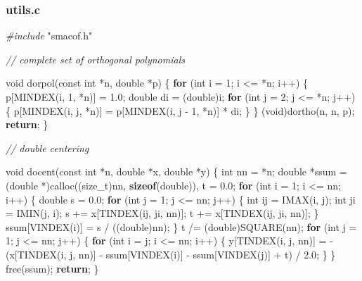 \documentclass[12pt,]{article}
\newenvironment{Shaded}{\begin{snugshade}}{\end{snugshade}}
\newcommand{\KeywordTok}[1]{\textcolor[rgb]{0.13,0.29,0.53}{\textbf{#1}}}
\newcommand{\DataTypeTok}[1]{\textcolor[rgb]{0.13,0.29,0.53}{#1}}
\newcommand{\DecValTok}[1]{\textcolor[rgb]{0.00,0.00,0.81}{#1}}
\newcommand{\FloatTok}[1]{\textcolor[rgb]{0.00,0.00,0.81}{#1}}
\newcommand{\ImportTok}[1]{#1}
\newcommand{\CommentTok}[1]{\textcolor[rgb]{0.56,0.35,0.01}{\textit{#1}}}
\newcommand{\ControlFlowTok}[1]{\textcolor[rgb]{0.13,0.29,0.53}{\textbf{#1}}}
\newcommand{\PreprocessorTok}[1]{\textcolor[rgb]{0.56,0.35,0.01}{\textit{#1}}}
\newcommand{\NormalTok}[1]{#1}
\begin{document}
\subsubsection{utils.c}\label{utils.c}

\begin{Shaded}
\begin{Highlighting}[]
\PreprocessorTok{#include }\ImportTok{"smacof.h"}

\CommentTok{// complete set of orthogonal polynomials}

\DataTypeTok{void}\NormalTok{ dorpol(}\DataTypeTok{const} \DataTypeTok{int}\NormalTok{ *n, }\DataTypeTok{double}\NormalTok{ *p) \{}
    \ControlFlowTok{for}\NormalTok{ (}\DataTypeTok{int}\NormalTok{ i = }\DecValTok{1}\NormalTok{; i <= *n; i++) \{}
\NormalTok{        p[MINDEX(i, }\DecValTok{1}\NormalTok{, *n)] = }\FloatTok{1.0}\NormalTok{;}
        \DataTypeTok{double}\NormalTok{ di = (}\DataTypeTok{double}\NormalTok{)i;}
        \ControlFlowTok{for}\NormalTok{ (}\DataTypeTok{int}\NormalTok{ j = }\DecValTok{2}\NormalTok{; j <= *n; j++) \{}
\NormalTok{            p[MINDEX(i, j, *n)] = p[MINDEX(i, j - }\DecValTok{1}\NormalTok{, *n)] * di;}
\NormalTok{        \}}
\NormalTok{    \}}
\NormalTok{    (}\DataTypeTok{void}\NormalTok{)dortho(n, n, p);}
    \ControlFlowTok{return}\NormalTok{;}
\NormalTok{\}}

\CommentTok{// double centering}

\DataTypeTok{void}\NormalTok{ docent(}\DataTypeTok{const} \DataTypeTok{int}\NormalTok{ *n, }\DataTypeTok{double}\NormalTok{ *x, }\DataTypeTok{double}\NormalTok{ *y) \{}
    \DataTypeTok{int}\NormalTok{ nn = *n;}
    \DataTypeTok{double}\NormalTok{ *ssum = (}\DataTypeTok{double}\NormalTok{ *)calloc((}\DataTypeTok{size_t}\NormalTok{)nn, }\KeywordTok{sizeof}\NormalTok{(}\DataTypeTok{double}\NormalTok{)), t = }\FloatTok{0.0}\NormalTok{;}
    \ControlFlowTok{for}\NormalTok{ (}\DataTypeTok{int}\NormalTok{ i = }\DecValTok{1}\NormalTok{; i <= nn; i++) \{}
        \DataTypeTok{double}\NormalTok{ s = }\FloatTok{0.0}\NormalTok{;}
        \ControlFlowTok{for}\NormalTok{ (}\DataTypeTok{int}\NormalTok{ j = }\DecValTok{1}\NormalTok{; j <= nn; j++) \{}
            \DataTypeTok{int}\NormalTok{ ij = IMAX(i, j);}
            \DataTypeTok{int}\NormalTok{ ji = IMIN(j, i);}
\NormalTok{            s += x[TINDEX(ij, ji, nn)];}
\NormalTok{            t += x[TINDEX(ij, ji, nn)];}
\NormalTok{        \}}
\NormalTok{        ssum[VINDEX(i)] = s / ((}\DataTypeTok{double}\NormalTok{)nn);}
\NormalTok{    \}}
\NormalTok{    t /= (}\DataTypeTok{double}\NormalTok{)SQUARE(nn);}
    \ControlFlowTok{for}\NormalTok{ (}\DataTypeTok{int}\NormalTok{ j = }\DecValTok{1}\NormalTok{; j <= nn; j++) \{}
        \ControlFlowTok{for}\NormalTok{ (}\DataTypeTok{int}\NormalTok{ i = j; i <= nn; i++) \{}
\NormalTok{            y[TINDEX(i, j, nn)] =}
\NormalTok{                -(x[TINDEX(i, j, nn)] - ssum[VINDEX(i)] - ssum[VINDEX(j)] + t) /}
                \FloatTok{2.0}\NormalTok{;}
\NormalTok{        \}}
\NormalTok{    \}}
\NormalTok{    free(ssum);}
    \ControlFlowTok{return}\NormalTok{;}
\NormalTok{\}}


\end{Highlighting}
\end{Shaded}
\end{document}
